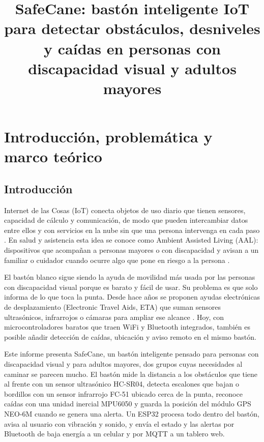 \documentclass[conference,a4paper]{IEEEtran}
\begin{document}
\title{SafeCane: bastón inteligente IoT para detectar obstáculos, desniveles y caídas en personas con discapacidad visual y adultos mayores}

\author{
}

\maketitle

\section{Introducción, problemática y marco teórico}

\subsection{Introducción}

 Internet de las Cosas (IoT) conecta objetos de uso diario que tienen sensores, capacidad de cálculo y comunicación, de modo que pueden intercambiar datos entre ellos y con servicios en la nube sin que una persona intervenga en cada paso \cite{atzori}. En salud y asistencia esta idea se conoce como Ambient Assisted Living (AAL): dispositivos que acompañan a personas mayores o con discapacidad y avisan a un familiar o cuidador cuando ocurre algo que pone en riesgo a la persona \cite{tsantikidou}.

El bastón blanco sigue siendo la ayuda de movilidad más usada por las personas con discapacidad visual porque es barato y fácil de usar. Su problema es que solo informa de lo que toca la punta. Desde hace años se proponen ayudas electrónicas de desplazamiento (Electronic Travel Aids, ETA) que suman sensores ultrasónicos, infrarrojos o cámaras para ampliar ese alcance \cite{dakopoulos}. Hoy, con microcontroladores baratos que traen WiFi y Bluetooth integrados, también es posible añadir detección de caídas, ubicación y aviso remoto en el mismo bastón.

Este informe presenta SafeCane, un bastón inteligente pensado para personas con discapacidad visual y para adultos mayores, dos grupos cuyas necesidades al caminar se parecen mucho. El bastón mide la distancia a los obstáculos que tiene al frente con un sensor ultrasónico HC-SR04, detecta escalones que bajan o bordillos con un sensor infrarrojo FC-51 ubicado cerca de la punta, reconoce caídas con una unidad inercial MPU6050 y guarda la posición del módulo GPS NEO-6M cuando se genera una alerta. Un ESP32 procesa todo dentro del bastón, avisa al usuario con vibración y sonido, y envía el estado y las alertas por Bluetooth de baja energía a un celular y por MQTT a un tablero web.
\end{document}
